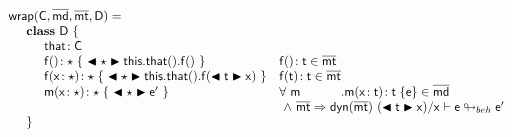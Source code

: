 \documentclass[a4paper,USenglish]{tex/lipics-v2016}
\begin{document}
\[\begin{array}{@{}ll@{}l@{}r@{~}c@{~}r}
\wrapAny\C\bmd\bmt\D = \\
\SP \class~\D~\{\\
\SPP \Fdef \that \C\\ 
\SPP   \Mdefz\f\any{~\BehCast\any{\Get{{\Get\this\that}}\f}~}
&  \Mtype\f{}\t \in \bmt\\
\SPP   \Mdef\f\x\any\any{~\BehCast\any{\Set{\Get\this\that}\f{\bscast\t\x}}~}
&  \Mtype\f\t\t \in \bmt\\
\SPP   \Mdef\m\x\any\any {~\BehCast\any{{\ep}}~}
&  \All \m \Mdef\m\x\t\t\e\in\b\md \\
&\multicolumn{5}{l}{~\wedge~\rtranst{\bmt}{\dyn{\bmt}}{(\BehCast\t\x)}\x{\e}{\ep}}
\\
\SP \}\\
\end{array}\]
\end{document}
